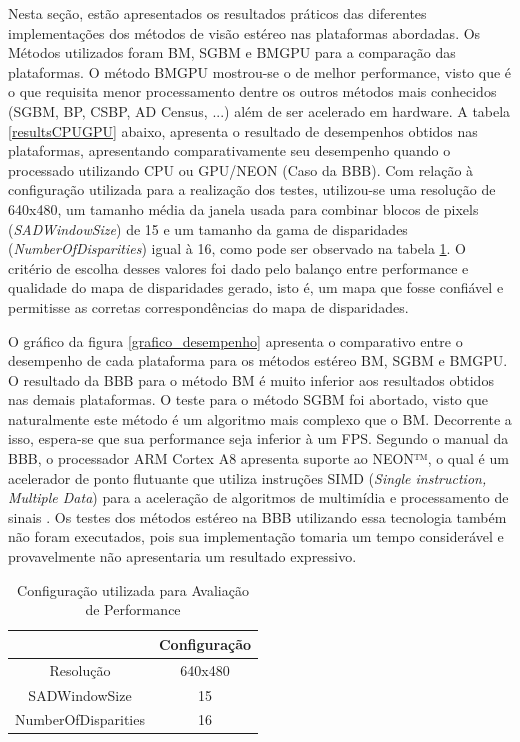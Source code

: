 Nesta seção, estão apresentados os resultados práticos das diferentes implementações dos métodos de visão estéreo nas plataformas abordadas. Os Métodos utilizados foram BM, SGBM e BMGPU para a comparação das plataformas. O método BMGPU mostrou-se o de melhor performance, visto que é o que requisita menor processamento dentre os outros métodos mais conhecidos (SGBM, BP, CSBP, AD Census, ...) além de ser acelerado em hardware. A tabela \ref{resultsCPUGPU} abaixo, apresenta o resultado de desempenhos obtidos nas plataformas, apresentando comparativamente seu desempenho quando o processado utilizando CPU ou GPU/NEON (Caso da BBB). Com relação à configuração utilizada para a realização dos testes, utilizou-se uma resolução de 640x480, um tamanho média da janela usada para combinar blocos de pixels (\textit{SADWindowSize}) de 15 e um tamanho da gama de disparidades (\textit{NumberOfDisparities}) igual à 16, como pode ser observado na tabela \ref{teste_values}. O critério de escolha desses valores foi dado pelo balanço entre performance e qualidade do mapa de disparidades gerado, isto é, um mapa que fosse confiável e permitisse as corretas correspondências do mapa de disparidades.

O gráfico da figura \ref{grafico_desempenho} apresenta o comparativo entre o desempenho de cada plataforma para os métodos estéreo BM, SGBM e BMGPU. O resultado da BBB para o método BM é muito inferior aos resultados obtidos nas demais plataformas. O teste para o método SGBM foi abortado, visto que naturalmente este método é um algoritmo mais complexo que o BM. Decorrente a isso, espera-se que sua performance seja inferior à um FPS. Segundo o manual da BBB, o processador ARM Cortex A8 apresenta suporte ao NEON™, o qual é um acelerador de ponto flutuante que utiliza instruções SIMD (\textit{Single instruction, Multiple Data}) para a aceleração de algoritmos de multimídia e processamento de sinais \cite{ARMNEON}. Os testes dos métodos estéreo na BBB utilizando essa tecnologia também não foram executados, pois sua implementação tomaria um tempo considerável e provavelmente não apresentaria um resultado expressivo. 

\begin{table}[]
\centering
\caption{Configuração utilizada para Avaliação de Performance}
\label{teste_values}
\begin{tabular}{|c|c|}
\hline
                    & Configuração \\ \hline
Resolução           & 640x480      \\ \hline
SADWindowSize       & 15           \\ \hline
NumberOfDisparities & 16           \\ \hline
\end{tabular}
\end{table}


